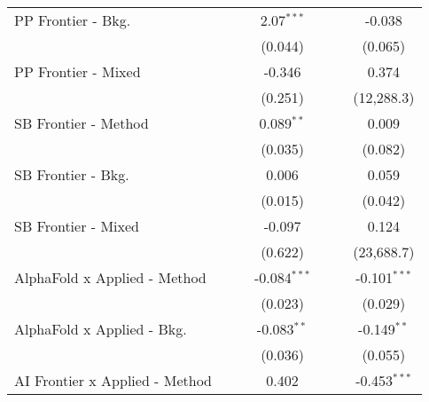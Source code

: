 \begin{tabular}{lcccccc}
   PP Frontier - Bkg.             &                &                & 2.07$^{***}$   &                &                & -0.038\\   
                                  &                &                & (0.044)        &                &                & (0.065)\\   
   PP Frontier - Mixed            &                &                & -0.346         &                &                & 0.374\\   
                                  &                &                & (0.251)        &                &                & (12,288.3)\\   
   SB Frontier - Method           &                &                & 0.089$^{**}$   &                &                & 0.009\\   
                                  &                &                & (0.035)        &                &                & (0.082)\\   
   SB Frontier - Bkg.             &                &                & 0.006          &                &                & 0.059\\   
                                  &                &                & (0.015)        &                &                & (0.042)\\   
   SB Frontier - Mixed            &                &                & -0.097         &                &                & 0.124\\   
                                  &                &                & (0.622)        &                &                & (23,688.7)\\   
   AlphaFold x Applied - Method   &                &                & -0.084$^{***}$ &                &                & -0.101$^{***}$\\   
                                  &                &                & (0.023)        &                &                & (0.029)\\   
   AlphaFold x Applied - Bkg.     &                &                & -0.083$^{**}$  &                &                & -0.149$^{**}$\\   
                                  &                &                & (0.036)        &                &                & (0.055)\\   
   AI Frontier x Applied - Method &                &                & 0.402          &                &                & -0.453$^{***}$\\   

\end{tabular}

